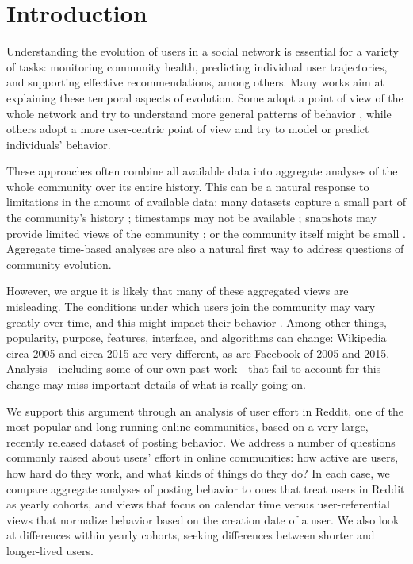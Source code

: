 
\section{Introduction}

Understanding the evolution of users in a social network is essential for a variety of tasks: monitoring community health, predicting individual user trajectories, and supporting effective recommendations, among others.  Many works aim at explaining these temporal aspects of evolution. Some adopt a point of view of the whole network and try to understand more general patterns of behavior \cite{Zhu2014, Kooti2010}, while others adopt a more user-centric point of view and try to model \cite{Correa2010, Priedhorsky2007, Panciera2009, Welser2011} or predict \cite{Danescu-niculescu-mizil2013} individuals' behavior.

These approaches often combine all available data into aggregate analyses of the whole community over its entire history.  This can be a natural response to limitations in the amount of available data: many datasets capture a small part of the community's history \cite{Artzi2012}; timestamps may not be available \cite{Priedhorsky2007, Pujol2010}; snapshots may provide limited views of the community \cite{Cosley2010}; or the community itself might be small \cite{Lewis2008}.  Aggregate time-based analyses are also a natural first way to address questions of community evolution.

However, we argue it is likely that many of these aggregated views are misleading. The conditions under which users join the community may vary greatly over time, and this might impact their behavior \cite{Miller2015}.  Among other things, popularity, purpose, features, interface, and algorithms can change: Wikipedia circa 2005 and circa 2015 are very different, as are Facebook of 2005 and 2015.  Analysis---including some of our own past work---that fail to account for this change may miss important details of what is really going on.

We support this argument through an analysis of user effort in Reddit, one of the most popular and long-running online communities, based on a very large, recently released dataset of posting behavior.  We address a number of questions commonly raised about users' effort in online communities: how active are users, how hard do they work, and what kinds of things do they do?  In each case, we compare aggregate analyses of posting behavior to ones that treat users in Reddit as yearly cohorts, and views that focus on calendar time versus user-referential views that normalize behavior based on the creation date of a user.  We also look at differences within yearly cohorts, seeking differences between shorter and longer-lived users.

